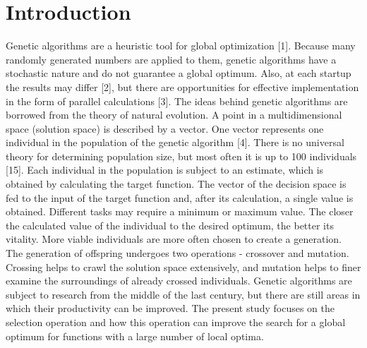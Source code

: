 \documentclass[graybox]{styles/svmult}
\begin{document}

\section{Introduction}
\label{sec:1}

Genetic algorithms are a heuristic tool for global optimization [1]. Because many randomly generated numbers are applied to them, genetic algorithms have a stochastic nature and do not guarantee a global optimum. Also, at each startup the results may differ [2], but there are opportunities for effective implementation in the form of parallel calculations [3]. The ideas behind genetic algorithms are borrowed from the theory of natural evolution. A point in a multidimensional space (solution space) is described by a vector. One vector represents one individual in the population of the genetic algorithm [4]. There is no universal theory for determining population size, but most often it is up to 100 individuals [15]. Each individual in the population is subject to an estimate, which is obtained by calculating the target function. The vector of the decision space is fed to the input of the target function and, after its calculation, a single value is obtained. Different tasks may require a minimum or maximum value. The closer the calculated value of the individual to the desired optimum, the better its vitality. More viable individuals are more often chosen to create a generation. The generation of offspring undergoes two operations - crossover and mutation. Crossing helps to crawl the solution space extensively, and mutation helps to finer examine the surroundings of already crossed individuals. Genetic algorithms are subject to research from the middle of the last century, but there are still areas in which their productivity can be improved. The present study focuses on the selection operation and how this operation can improve the search for a global optimum for functions with a large number of local optima.
\end{document}
